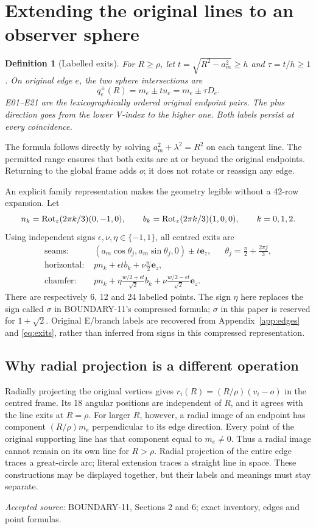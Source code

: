 \documentclass[11pt,a4paper]{article}
\newtheorem{definition}[theorem]{Definition}
\newcommand{\ez}{\mathbf e_z}\newcommand{\ph}{\varphi}
\newcommand{\source}[1]{\par{\small\emph{Accepted source:} #1}\par}
\begin{document}
\section{Extending the original lines to an observer sphere}\label{sec:lines}
\begin{definition}[Labelled exits]\label{def:exits}
For $R\geq\rho$, let $t=\sqrt{R^2-a_m^2}\geq h$ and $\tau=t/h\geq1$. On original edge $e$, the two sphere intersections are
\begin{equation}\label{eq:exits}
q_e^\pm(R)=m_e\pm t u_e=m_e\pm\tau D_e.
\end{equation}
E01--E21 are the lexicographically ordered original endpoint pairs. The plus direction goes from the lower V-index to the higher one. Both labels persist at every coincidence.
\end{definition}
The formula follows directly by solving $a_m^2+\lambda^2=R^2$ on each tangent line. The permitted range ensures that both exits are at or beyond the original endpoints. Returning to the global frame adds $o$; it does not rotate or reassign any edge.

An explicit family representation makes the geometry legible without a 42-row expansion. Let
\[
n_k=\operatorname{Rot}_z(2\pi k/3)(0,-1,0),\qquad b_k=\operatorname{Rot}_z(2\pi k/3)(1,0,0),\qquad k=0,1,2.
\]
Using independent signs $\epsilon,\nu,\eta\in\{-1,1\}$, all centred exits are
\begin{align}
\text{seams: }& (a_m\cos\theta_j,a_m\sin\theta_j,0)\pm t\ez,
&&\theta_j=\frac\pi2+\frac{2\pi j}{3},\label{eq:seams}\\
\text{horizontal: }&p n_k+\epsilon t b_k+\nu\frac w2\ez,\label{eq:horizontal}\\
\text{chamfer: }&p n_k+\eta\frac{w/2+\epsilon t}{\sqrt2}b_k
+\nu\frac{w/2-\epsilon t}{\sqrt2}\ez.\label{eq:chamfer}
\end{align}
There are respectively 6, 12 and 24 labelled points. The sign $\eta$ here replaces the sign called $\sigma$ in BOUNDARY-11's compressed formula; $\sigma$ in this paper is reserved for $1+\sqrt2$. Original E/branch labels are recovered from Appendix~\ref{app:edges} and \eqref{eq:exits}, rather than inferred from signs in this compressed representation.

\subsection{Why radial projection is a different operation}
Radially projecting the original vertices gives $r_i(R)=(R/\rho)(v_i-o)$ in the centred frame. Its 18 angular positions are independent of $R$, and it agrees with the line exits at $R=\rho$. For larger $R$, however, a radial image of an endpoint has component $(R/\rho)m_e$ perpendicular to its edge direction. Every point of the original supporting line has that component equal to $m_e\ne0$. Thus a radial image cannot remain on its own line for $R>\rho$. Radial projection of the entire edge traces a great-circle arc; literal extension traces a straight line in space. These constructions may be displayed together, but their labels and meanings must stay separate.
\source{BOUNDARY-11, Sections 2 and 6; exact inventory, edges and point formulas.}
\end{document}
